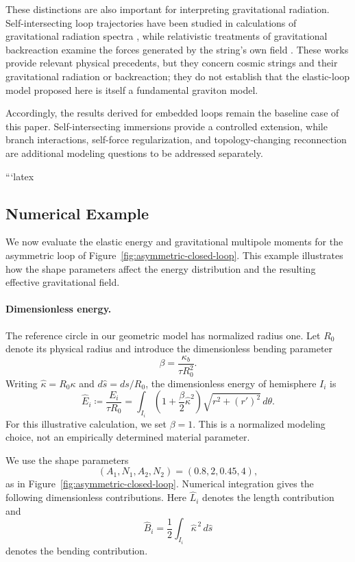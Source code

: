 \documentclass{article}
\numberwithin{tm}{section}
\numberwithin{dn}{section}
\numberwithin{as}{section}
\numberwithin{rk}{section}
\numberwithin{lem}{section}
\numberwithin{ax}{section}
\numberwithin{pp}{section}
\numberwithin{eg}{section}
\numberwithin{war}{section}
\numberwithin{equation}{section}
\numberwithin{prop}{section}
\numberwithin{nt}{section}
\numberwithin{rc}{section}
\begin{document}
These distinctions are also important for interpreting gravitational
radiation. Self-intersecting loop trajectories have been studied
in calculations of gravitational radiation spectra
\cite{StormScherrer2024GVLoops}, while relativistic treatments
of gravitational backreaction examine the forces generated by
the string's own field
\cite{ChernoffFlanaganWardell2019StringBackreaction}. These works
provide relevant physical precedents, but they concern cosmic
strings and their gravitational radiation or backreaction; they
do not establish that the elastic-loop model proposed here is
itself a fundamental graviton model.

Accordingly, the results derived for embedded loops remain the
baseline case of this paper. Self-intersecting immersions provide
a controlled extension, while branch interactions, self-force
regularization, and topology-changing reconnection are additional
modeling questions to be addressed separately.

\appendix
```latex
\subsection{Numerical Example}
\label{subsec:numerical-example}

We now evaluate the elastic energy and gravitational multipole
moments for the asymmetric loop of
Figure~\ref{fig:asymmetric-closed-loop}. This example illustrates
how the shape parameters affect the energy distribution and the
resulting effective gravitational field.

\paragraph{Dimensionless energy.}
The reference circle in our geometric model has normalized radius
one. Let \(R_0\) denote its physical radius and introduce the
dimensionless bending parameter
\[
\beta=\frac{\kappa_b}{\tau R_0^2}.
\]
Writing \(\widehat{\kappa}=R_0\kappa\) and
\(d\widehat{s}=ds/R_0\), the dimensionless energy of hemisphere
\(I_i\) is
\[
\widehat{E}_i
\coloneq \frac{E_i}{\tau R_0}
=
\int_{I_i}
\left(1+\frac{\beta}{2}\widehat{\kappa}^2\right)
\sqrt{r^2+(r')^2}\,d\theta.
\]
For this illustrative calculation, we set \(\beta=1\).
This is a normalized modeling choice, not an empirically determined
material parameter.

We use the shape parameters
\[
(A_1,N_1,A_2,N_2)=(0.8,2,0.45,4),
\]
as in Figure~\ref{fig:asymmetric-closed-loop}. Numerical
integration gives the following dimensionless contributions.
Here \(\widehat{L}_i\) denotes the length contribution and
\[
\widehat{B}_i
=
\frac12\int_{I_i}\widehat{\kappa}^{\,2}\,d\widehat{s}
\]
denotes the bending contribution.
\end{document}
